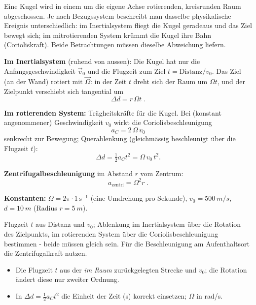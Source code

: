 
Eine Kugel wird in einem um die eigene Achse rotierenden, kreisrunden Raum
abgeschossen. Je nach Bezugssystem beschreibt man dasselbe physikalische
Ereignis unterschiedlich: im Inertialsystem fliegt die Kugel geradeaus und das
Ziel bewegt sich; im mitrotierenden System krümmt die Kugel ihre Bahn
(Corioliskraft). Beide Betrachtungen müssen dieselbe Abweichung liefern.

\begin{werkzeugkasten}[Werkzeuge]
\textbf{Im Inertialsystem} (ruhend von aussen): Die Kugel hat nur die
Anfangsgeschwindigkeit $\vec v_0$ und die Flugzeit zum Ziel
$t=\text{Distanz}/v_0$. Das Ziel (an der Wand) rotiert mit $\vec\Omega$:
in der Zeit $t$ dreht sich der Raum um $\Omega t$, und der Zielpunkt
verschiebt sich tangential um
\begin{equation}
  \Delta d = r\,\Omega t\;.
\end{equation}

\textbf{Im rotierenden System:} Trägheitskräfte für die Kugel. Bei
(konstant angenommener) Geschwindigkeit $v_0$ wirkt die
Coriolisbeschleunigung
\begin{equation}
  a_C = 2\,\Omega\, v_0
\end{equation}
senkrecht zur Bewegung; Querablenkung (gleichmässig beschleunigt über die
Flugzeit $t$):
\begin{equation}
  \Delta d = \tfrac12 a_C t^2 = \Omega\, v_0\, t^2.
\end{equation}

\textbf{Zentrifugalbeschleunigung} im Abstand $r$ vom Zentrum:
\begin{equation}
  a_\mathrm{zentri} = \Omega^2 r\;.
\end{equation}

\textbf{Konstanten:} $\Omega = 2\pi\cdot 1\,\mathrm{s^{-1}}$ (eine Umdrehung
pro Sekunde), $v_0=\qty{500}{m/s}$, $d=\qty{10}{m}$ (Radius $r=\qty{5}{m}$).
\end{werkzeugkasten}

\begin{werkzeugkasten}
Flugzeit $t$ aus Distanz und $v_0$; Ablenkung im Inertialsystem über die
Rotation des Zielpunkts, im rotierenden System über die Coriolisbeschleunigung
bestimmen - beide müssen gleich sein. Für die Beschleunigung am Aufenthaltsort
die Zentrifugalkraft nutzen.
\end{werkzeugkasten}

\begin{achtung}
\begin{itemize}
  \item Die Flugzeit $t$ aus der \emph{im Raum} zurückgelegten Strecke und
       $v_0$; die Rotation ändert diese nur zweiter Ordnung.
  \item In $\Delta d=\tfrac12 a_C t^2$ die Einheit der Zeit (s) korrekt
       einsetzen; $\Omega$ in rad/s.
\end{itemize}
\end{achtung}